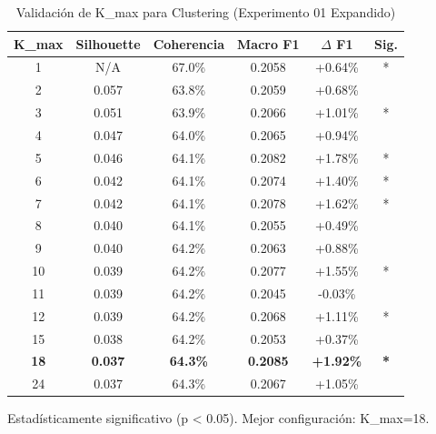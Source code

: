 \begin{table}[htbp]
\centering
\caption{Validación de K\_max para Clustering (Experimento 01 Expandido)}
\label{tab:clustering_expanded}
\begin{tabular}{cccccc}
\toprule
\textbf{K\_max} & \textbf{Silhouette} & \textbf{Coherencia} & \textbf{Macro F1} & \textbf{$\Delta$ F1} & \textbf{Sig.} \\
\midrule
1  & N/A   & 67.0\% & 0.2058 & +0.64\% & * \\
2  & 0.057 & 63.8\% & 0.2059 & +0.68\% &   \\
3  & 0.051 & 63.9\% & 0.2066 & +1.01\% & * \\
4  & 0.047 & 64.0\% & 0.2065 & +0.94\% &   \\
5  & 0.046 & 64.1\% & 0.2082 & +1.78\% & * \\
6  & 0.042 & 64.1\% & 0.2074 & +1.40\% & * \\
7  & 0.042 & 64.1\% & 0.2078 & +1.62\% & * \\
8  & 0.040 & 64.1\% & 0.2055 & +0.49\% &   \\
9  & 0.040 & 64.2\% & 0.2063 & +0.88\% &   \\
10 & 0.039 & 64.2\% & 0.2077 & +1.55\% & * \\
11 & 0.039 & 64.2\% & 0.2045 & -0.03\% &   \\
12 & 0.039 & 64.2\% & 0.2068 & +1.11\% & * \\
15 & 0.038 & 64.2\% & 0.2053 & +0.37\% &   \\
\rowcolor{green!20}
\textbf{18} & \textbf{0.037} & \textbf{64.3\%} & \textbf{0.2085} & \textbf{+1.92\%} & \textbf{*} \\
24 & 0.037 & 64.3\% & 0.2067 & +1.05\% &   \\
\bottomrule
\end{tabular}
\begin{tablenotes}
\small
\item * Estadísticamente significativo (p < 0.05). Mejor configuración: K\_max=18.
\end{tablenotes}
\end{table}

